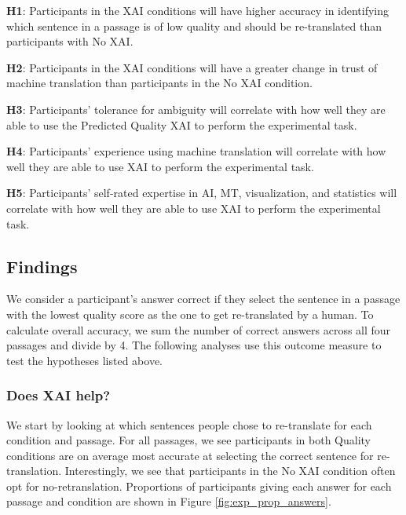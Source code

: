 \begin{compacthang}
    \item \textbf{H1}: Participants in the XAI conditions will have higher accuracy in identifying which sentence in a passage is of low quality and should be re-translated than participants with No XAI. 
    \item \textbf{H2}: Participants in the XAI conditions will have a greater change in trust of machine translation than participants in the No XAI condition. 
    \item \textbf{H3}: Participants’ tolerance for ambiguity will correlate with how well they are able to use the Predicted Quality XAI to perform the experimental task. 
    \item \textbf{H4}: Participants’ experience using machine translation will correlate with how well they are able to use XAI to perform the experimental task. 
    \item \textbf{H5}: Participants’ self-rated expertise in AI, MT, visualization, and statistics will correlate with how well they are able to use XAI to perform the experimental task.   
\end{compacthang}

\subsection{Findings}

We consider a participant’s answer correct if they select the sentence in a passage with the lowest quality score as the one to get re-translated by a human. To calculate overall accuracy, we sum the number of correct answers across all four passages and divide by 4. The following analyses use this outcome measure to test the hypotheses listed above.

\subsubsection{Does XAI help?}

We start by looking at which sentences people chose to re-translate for each condition and passage. For all passages, we see participants in both Quality conditions are on average most accurate at selecting the correct sentence for re-translation. Interestingly, we see that participants in the No XAI condition often opt for no-retranslation. Proportions of participants giving each answer for each passage and condition are shown in Figure \ref{fig:exp_prop_answers}.

